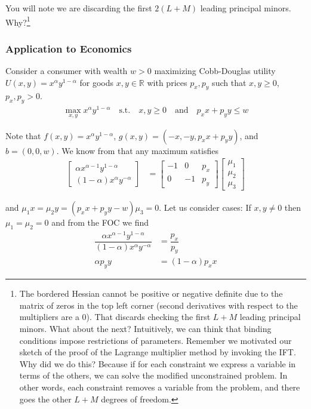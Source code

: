 \documentclass{article}
\begin{document}
You will note we are discarding the first $2(L + M)$ leading principal minors. Why?\footnote{The bordered Hessian cannot be  positive or negative definite due to the  matrix of  zeros in the top left corner (second derivatives with respect to the multipliers are a $0$). That discards checking the first $L + M$ leading principal minors. What about the next? Intuitively, we can think that binding conditions impose restrictions of parameters. Remember we motivated our sketch of the proof of the Lagrange multiplier method by invoking the IFT. Why did we do this? Because if for each constraint we express a variable in terms  of the others, we can solve the modified unconstrained problem. In other words, each constraint removes a variable from the problem, and there goes the other $L + M$ degrees of freedom.}

\subsubsection{Application to Economics}
\label{ssub:application_to_economics}

Consider a consumer with wealth $w > 0$ maximizing Cobb-Douglas utility $U(x, y) = x^\alpha y^{1 - \alpha}$ for goods $x, y \in \mathbb{R}$ with prices $p_x, p_y$ such that $x, y \ge 0$, $p_x, p_y > 0$.
\begin{align*}
  \max_{x, y} x^{\alpha} y^{1 - \alpha}
  \quad\text{s.t.}\quad
  x, y \ge 0
  \quad\text{and}\quad
  p_x x + p_y y \le w
\end{align*}

Note that $f(x, y) = x^\alpha y^{1 - \alpha}$, $g(x, y) = (-x, -y, p_x x + p_y y)$, and $b = (0, 0, w)$. We know from  that any maximum satisfies
\begin{align*}
  \begin{bmatrix}
    \alpha x^{\alpha - 1} y^{1- \alpha}
    \\
    (1 - \alpha) x^{\alpha} y^{- \alpha}
  \end{bmatrix}
  &
  =
  \begin{bmatrix}
    -1 & 0 & p_x \\
    0 & -1 & p_y
  \end{bmatrix}
  \begin{bmatrix}
    \mu_1 \\ \mu_2 \\ \mu_3
  \end{bmatrix}
\end{align*}

and $\mu_1 x = \mu_2 y = (p_x x + p_y y - w) \mu_3 = 0$. Let us consider cases: If
$x, y \ne 0$ then $\mu_1 = \mu_2 = 0$ and from the FOC we find
\begin{align*}
  \dfrac{\alpha x^{\alpha - 1} y^{1 - \alpha}}{(1 - \alpha) x^{\alpha} y^{- \alpha}}
  &
  =
  \dfrac{p_x}{p_y}
  \\
  \alpha p_y y
  &
  =
  (1 - \alpha) p_x x
\end{align*}
\end{document}
